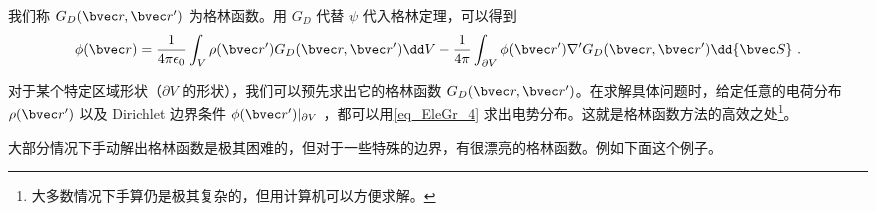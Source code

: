 我们称 $G_D(\bvec r,\bvec r')$ 为格林函数。用 $G_D$ 代替 $\psi$ 代入格林定理，可以得到
\begin{equation}\label{eq_EleGr_4}
\phi(\bvec r)=\frac{1}{4\pi\epsilon_0}\int_V \rho(\bvec r')G_D(\bvec r,\bvec r')\dd V-\frac{1}{4\pi}\int_{\partial V} \phi(\bvec r')\nabla'G_D(\bvec r,\bvec r')\dd {\bvec S}~.
\end{equation}

对于某个特定区域形状（$\partial V$ 的形状），我们可以预先求出它的格林函数 $G_D(\bvec r,\bvec r')$。在求解具体问题时，给定任意的电荷分布 $\rho(\bvec r')$ 以及 Dirichlet 边界条件 $\phi(\bvec r')|_{\partial V}$ ，都可以用\autoref{eq_EleGr_4} 求出电势分布。这就是格林函数方法的高效之处\footnote{大多数情况下手算仍是极其复杂的，但用计算机可以方便求解。}。

大部分情况下手动解出格林函数是极其困难的，但对于一些特殊的边界，有很漂亮的格林函数。例如下面这个例子。

